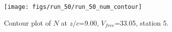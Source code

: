 \begin{figure}[H]
\centering
\texttt{[image: figs/run\_50/run\_50\_num\_contour]}
\caption{Contour plot of $N$ at $z/c$=9.00, $V_{free}$=33.05, station 5.}
\label{fig:run_50_num_contour}
\end{figure}


